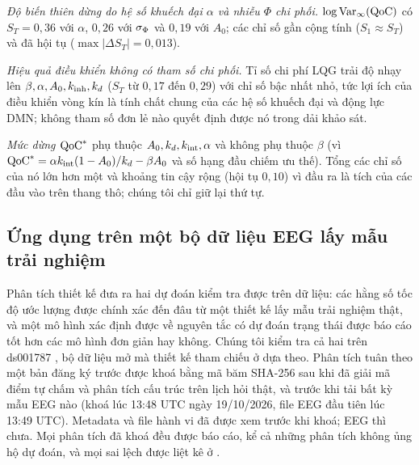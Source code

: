\emph{Độ biến thiên dừng do hệ số khuếch đại $\alpha$ và nhiễu $\Phi$ chi phối.} $\log\operatorname{Var}_\infty(\mathrm{QoC})$ có $S_T=0{,}36$ với $\alpha$, $0{,}26$ với $\sigma_{\Phi}$ và $0{,}19$ với $A_0$; các chỉ số gần cộng tính ($S_1\approx S_T$) và đã hội tụ ($\max|\Delta S_T|=0{,}013$).

\emph{Hiệu quả điều khiển không có tham số chi phối.} Tỉ số chi phí LQG trải độ nhạy lên $\beta,\alpha,A_0,k_{\mathrm{inh}},k_{d}$ ($S_T$ từ $0{,}17$ đến $0{,}29$) với chỉ số bậc nhất nhỏ, tức lợi ích của điều khiển vòng kín là tính chất chung của các hệ số khuếch đại và động lực DMN; không tham số đơn lẻ nào quyết định được nó trong dải khảo sát.

\emph{Mức dừng $\mathrm{QoC}^*$} phụ thuộc $A_0,k_{d},k_{\mathrm{int}},\alpha$ và không phụ thuộc $\beta$ (vì $\mathrm{QoC}^*=\alpha k_{\mathrm{int}}(1-A_0)/k_{d}-\beta A_0$ và số hạng đầu chiếm ưu thế). Tổng các chỉ số của nó lớn hơn một và khoảng tin cậy rộng (hội tụ $0{,}10$) vì đầu ra là tích của các đầu vào trên thang thô; chúng tôi chỉ giữ lại thứ tự.

\subsection{Ứng dụng trên một bộ dữ liệu EEG lấy mẫu trải nghiệm}
\label{sec:res-real}

Phân tích thiết kế đưa ra hai dự đoán kiểm tra được trên dữ liệu: các hằng số tốc độ ước lượng được chính xác đến đâu từ một thiết kế lấy mẫu trải nghiệm thật, và một mô hình xác định được về nguyên tắc có dự đoán trạng thái được báo cáo tốt hơn các mô hình đơn giản hay không. Chúng tôi kiểm tra cả hai trên ds001787 \citep{Delorme2024ds,Brandmeyer2018}, bộ dữ liệu mở mà thiết kế tham chiếu ở  dựa theo. Phân tích tuân theo một bản đăng ký trước được khoá bằng mã băm SHA-256 sau khi đã giải mã điểm tự chấm và phân tích cấu trúc trên lịch hỏi thật, và trước khi tải bất kỳ mẫu EEG nào (khoá lúc 13:48 UTC ngày 19/10/2026, file EEG đầu tiên lúc 13:49 UTC). Metadata và file hành vi đã được xem trước khi khoá; EEG thì chưa. Mọi phân tích đã khoá đều được báo cáo, kể cả những phân tích không ủng hộ dự đoán, và mọi sai lệch được liệt kê ở .

